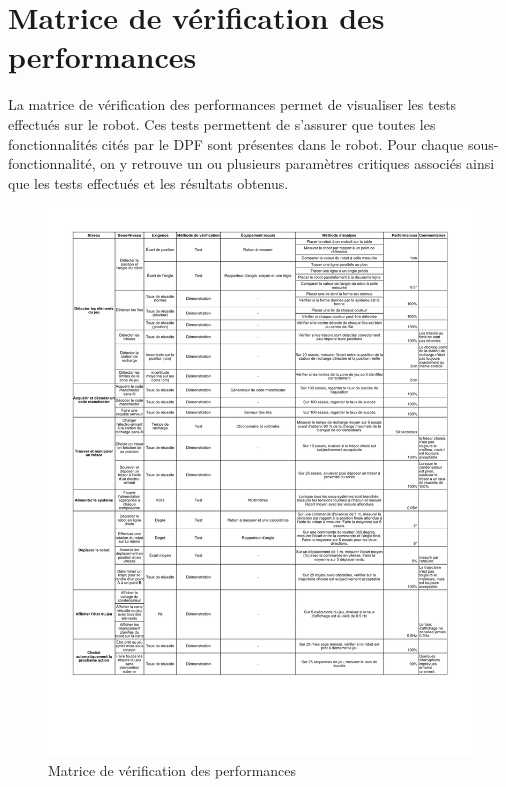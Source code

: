 \chapter{Matrice de vérification des performances}

La matrice de vérification des performances permet de visualiser les tests effectués sur le robot. Ces tests permettent de s'assurer que toutes les fonctionnalités cités par le DPF sont présentes dans le robot. Pour chaque sous-fonctionnalité, on y retrouve un ou plusieurs paramètres critiques associés ainsi que les tests effectués et les résultats obtenus.

\begin{figure}[h]
  \centering
  \caption{Matrice de vérification des performances}
  \includegraphics[scale=0.85]{resources/verification.pdf}
\end{figure}
